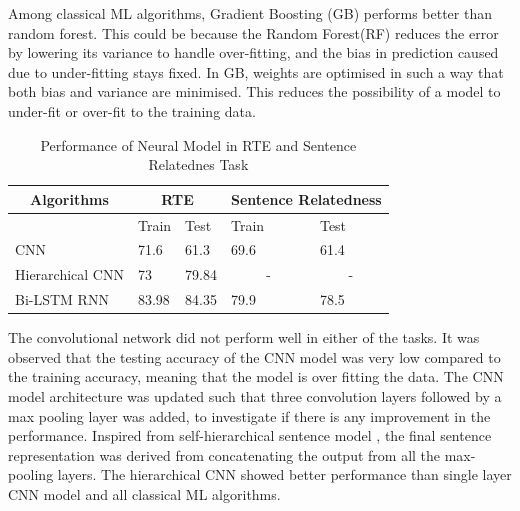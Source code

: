 \documentclass[12pt]{report} %
\begin{document}
 Among classical ML algorithms, Gradient Boosting (GB) performs better than random forest. This could be because the Random Forest(RF) reduces the error by lowering its variance to handle over-fitting, and the bias in prediction caused due to under-fitting stays fixed. In GB, weights are optimised in such a way that both bias and variance are minimised. This reduces the possibility of a model to under-fit or over-fit to the training data.

\begin{table}[]
	\centering
\caption{Performance of Neural Model in RTE and Sentence Relatednes Task}
\label{neu_perf}
	\begin{tabular}{|l|l|l|l|l|}
		\hline
		\multicolumn{1}{|c|}{\textbf{Algorithms}} & \multicolumn{2}{c|}{\textbf{RTE}} & \multicolumn{2}{l|}{\textbf{Sentence Relatedness}} \\ \hline
		& Train           & Test            & Train                    & Test                    \\ \hline
		CNN                                       & 71.6            & 61.3            & 69.6                     & 61.4                    \\ \hline
		Hierarchical CNN                          & 73              & 79.84           & \multicolumn{1}{c|}{-}   & \multicolumn{1}{c|}{-}  \\ \hline
		Bi-LSTM RNN                               & 83.98           & 84.35           & 79.9                     & 78.5                    \\ \hline
	\end{tabular}
\end{table}


The convolutional network did not perform well in either of the tasks. It was observed that the testing accuracy of the CNN model was very low compared to the training accuracy, meaning that the model is over fitting the data. The CNN model architecture was updated such that three convolution layers followed by a max pooling layer was added, to investigate if there is any improvement in the performance. Inspired from self-hierarchical sentence model \citep{zhao2015self}, the final sentence representation was derived from concatenating the output from all the max-pooling layers. The hierarchical CNN showed better performance than single layer CNN model and all classical ML algorithms.


\end{document}
